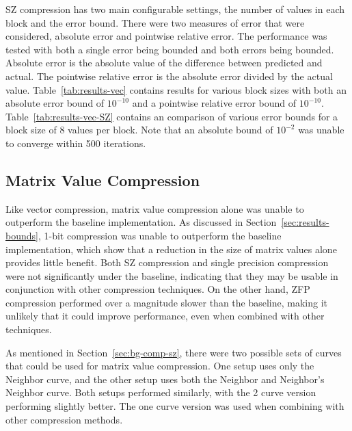 SZ compression has two main configurable settings, the number of values in each block and the error bound.
There were two measures of error that were considered, absolute error and pointwise relative error.
The performance was tested with both a single error being bounded and both errors being bounded.
Absolute error is the absolute value of the difference between predicted and actual.
The pointwise relative error is the absolute error divided by the actual value.
Table~\ref{tab:results-vec} contains results for various block sizes with both an absolute error bound of \(10^{-10}\) and a pointwise relative error bound of \(10^{-10}\).
Table~\ref{tab:results-vec-SZ} contains an comparison of various error bounds for a block size of 8 values per block.
Note that an absolute bound of \(10^{-2}\) was unable to converge within 500 iterations.



\subsection{Matrix Value Compression}
Like vector compression, matrix value compression alone was unable to outperform the baseline implementation.
As discussed in Section~\ref{sec:results-bounds}, 1-bit compression was unable to outperform the baseline implementation, which show that a reduction in the size of matrix values alone provides little benefit.
Both SZ compression and single precision compression were not significantly under the baseline, indicating that they may be usable in conjunction with other compression techniques.
On the other hand, ZFP compression performed over a magnitude slower than the baseline, making it unlikely that it could improve performance, even when combined with other techniques.

As mentioned in Section~\ref{sec:bg-comp-sz}, there were two possible sets of curves that could be used for matrix value compression.
One setup uses only the Neighbor curve, and the other setup uses both the Neighbor and Neighbor's Neighbor curve.
Both setups performed similarly, with the 2 curve version performing slightly better.
The one curve version was used when combining with other compression methods.

